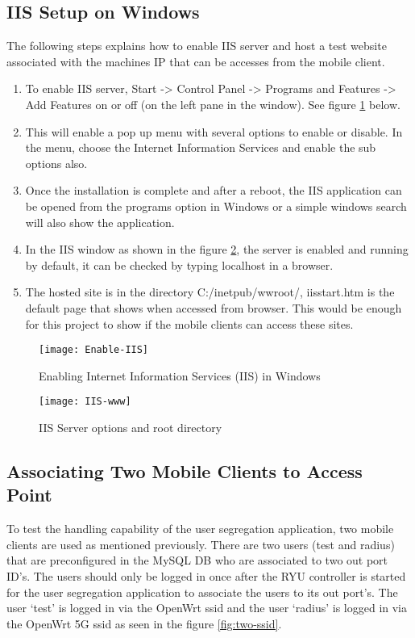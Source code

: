\subsection{IIS Setup on Windows}
The following steps explains how to enable IIS server and host a test website associated with the machines IP that can be accesses from the mobile client.

\begin{enumerate}
	\item To enable IIS server, Start -> Control Panel -> Programs and Features -> Add Features on or off (on the left pane in the window). See figure \ref{fig:enable_iis} below.
	\item This will enable a pop up menu with several options to enable or disable. In the menu, choose the Internet Information Services and enable the sub options also.
	\item Once the installation is complete and after a reboot, the IIS application can be opened from the programs option in Windows or a simple windows search will also show the application.
	\item In the IIS window as shown in the figure \ref{fig:iis-www}, the server is enabled and running by default, it can be checked by typing localhost in a browser.
	\item The hosted site is in the directory C:/inetpub/wwroot/, iisstart.htm is the default page that shows when accessed from browser. This would be enough for this project to show if the mobile clients can access these sites.
	
\end{enumerate}
  \begin{figure}[H]
	\centering
	\texttt{[image: Enable-IIS]}
	\caption {Enabling Internet Information Services (IIS) in Windows}
	\label{fig:enable_iis}
	\vspace{-10pt}
  \end{figure}
  \begin{figure}[H]
	\centering
	\texttt{[image: IIS-www]}
	\caption {IIS Server options and root directory}
	\label{fig:iis-www}
	\vspace{-10pt}
  \end{figure}
\subsection{Associating Two Mobile Clients to Access Point}
To test the handling capability of the user segregation application, two mobile clients are used as mentioned previously. There are two users (test and radius) that are preconfigured in the MySQL DB who are associated to two out port ID’s. The users should only be logged in once after the RYU controller is started for the user segregation application to associate the users to its out port’s. The user ‘test’ is logged in via the OpenWrt ssid and the user ‘radius’ is logged in via the OpenWrt 5G ssid as seen in the figure \ref{fig:two-ssid}.
